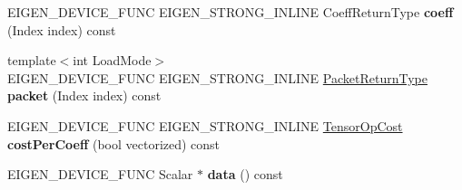 \begin{DoxyCompactItemize}
E\+I\+G\+E\+N\+\_\+\+D\+E\+V\+I\+C\+E\+\_\+\+F\+U\+NC E\+I\+G\+E\+N\+\_\+\+S\+T\+R\+O\+N\+G\+\_\+\+I\+N\+L\+I\+NE Coeff\+Return\+Type {\bfseries coeff} (Index index) const
\item 
\mbox{\label{struct_eigen_1_1_tensor_evaluator_3_01const_01_tensor_inflation_op_3_01_strides_00_01_arg_type_01_4_00_01_device_01_4_ae452608e45bc4cf4e1fd6ba1954e4c04}} 
{\footnotesize template$<$int Load\+Mode$>$ }\\E\+I\+G\+E\+N\+\_\+\+D\+E\+V\+I\+C\+E\+\_\+\+F\+U\+NC E\+I\+G\+E\+N\+\_\+\+S\+T\+R\+O\+N\+G\+\_\+\+I\+N\+L\+I\+NE \hyperlink{group___sparse_core___module}{Packet\+Return\+Type} {\bfseries packet} (Index index) const
\item 
\mbox{\label{struct_eigen_1_1_tensor_evaluator_3_01const_01_tensor_inflation_op_3_01_strides_00_01_arg_type_01_4_00_01_device_01_4_aedaf7599f20c726ca5ddce4d93757e4b}} 
E\+I\+G\+E\+N\+\_\+\+D\+E\+V\+I\+C\+E\+\_\+\+F\+U\+NC E\+I\+G\+E\+N\+\_\+\+S\+T\+R\+O\+N\+G\+\_\+\+I\+N\+L\+I\+NE \hyperlink{class_eigen_1_1_tensor_op_cost}{Tensor\+Op\+Cost} {\bfseries cost\+Per\+Coeff} (bool vectorized) const
\item 
\mbox{\label{struct_eigen_1_1_tensor_evaluator_3_01const_01_tensor_inflation_op_3_01_strides_00_01_arg_type_01_4_00_01_device_01_4_a49a1de1adebda60c42167cf8eced903d}} 
E\+I\+G\+E\+N\+\_\+\+D\+E\+V\+I\+C\+E\+\_\+\+F\+U\+NC Scalar $\ast$ {\bfseries data} () const
\end{DoxyCompactItemize}
